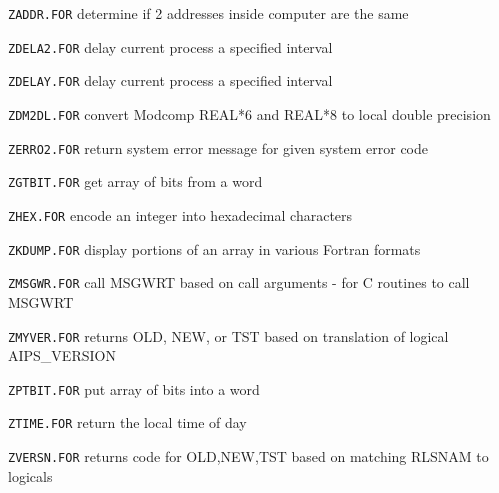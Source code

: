 {\item{\tt ZADDR.FOR} determine if 2 addresses inside computer are the same
\item{\tt ZDELA2.FOR} delay current process a specified interval
\item{\tt ZDELAY.FOR} delay current process a specified interval
\item{\tt ZDM2DL.FOR} convert Modcomp REAL*6 and REAL*8 to local double precision
\item{\tt ZERRO2.FOR} return system error message for given system error code
\item{\tt ZGTBIT.FOR} get array of bits from a word
\item{\tt ZHEX.FOR} encode an integer into hexadecimal characters
\item{\tt ZKDUMP.FOR} display portions of an array in various Fortran formats
\item{\tt ZMSGWR.FOR} call MSGWRT based on call arguments - for C routines to call MSGWRT
\item{\tt ZMYVER.FOR} returns OLD, NEW, or TST based on translation of logical AIPS\_VERSION
\item{\tt ZPTBIT.FOR} put array of bits into a word
\item{\tt ZTIME.FOR} return the local time of day
\item{\tt ZVERSN.FOR} returns code for OLD,NEW,TST based on matching RLSNAM to logicals

\medskip

}
